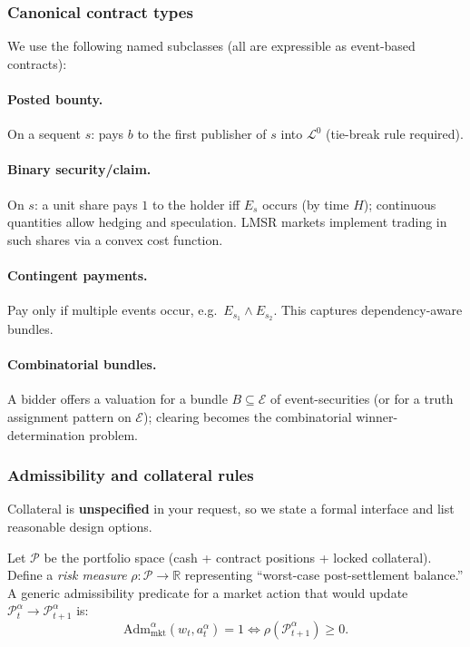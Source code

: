 \subsubsection{Canonical contract types}

We use the following named subclasses (all are expressible as event-based contracts):

\paragraph{Posted bounty.}
On a sequent \(s\): pays \(b\) to the first publisher of \(s\) into \(\mathcal{L}^0\) (tie-break rule required).

\paragraph{Binary security/claim.}
On \(s\): a unit share pays \(1\) to the holder iff \(E_s\) occurs (by time \(H\)); continuous quantities allow hedging and speculation. LMSR markets implement trading in such shares via a convex cost function.

\paragraph{Contingent payments.}
Pay only if multiple events occur, e.g.\ \(E_{s_1}\wedge E_{s_2}\). This captures dependency-aware bundles.

\paragraph{Combinatorial bundles.}
A bidder offers a valuation for a bundle \(B\subseteq\mathcal{E}\) of event-securities (or for a truth assignment pattern on \(\mathcal{E}\)); clearing becomes the combinatorial winner-determination problem.

\subsubsection{Admissibility and collateral rules}

Collateral is \textbf{unspecified} in your request, so we state a formal interface and list reasonable design options.

Let \(\mathcal{P}\) be the portfolio space (cash + contract positions + locked collateral). Define a \emph{risk measure} \(\rho:\mathcal{P}\to\mathbb{R}\) representing ``worst-case post-settlement balance.'' A generic admissibility predicate for a market action that would update \(\mathcal{P}_t^\alpha\to\mathcal{P}_{t+1}^\alpha\) is:
\[
\mathrm{Adm}_{\mathrm{mkt}}^\alpha(w_t,a_t^\alpha)=1 \iff \rho(\mathcal{P}_{t+1}^\alpha)\ge 0.
\]

